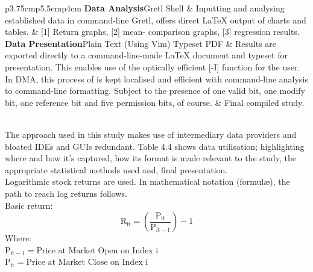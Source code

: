 \documentclass[11pt, english]{article}
\begin{document}
\begin{center}
\begin{longtable}{p{3.75cm}p{5.5cm}p{4cm}}
			\textbf{Data Analysis}\newline Gretl Shell & Inputting and analysing established data in command-line Gretl, offers direct {\LaTeX} output of charts and tables. & [1] Return graphs, [2] mean- comparison graphs, [3] regression results.\\
			\textbf{Data Presentation}\newline Plain Text (Using Vim)\newline {\LaTeX} Typeset PDF & Results are exported directly to a command-line-made {\LaTeX} document and typeset for presentation. This enables use of the optically efficient [-I] function for the user. In DMA, this process of is kept localised and efficient with command-line analysis to command-line formatting. Subject to the presence of one valid bit, one modify bit, one reference bit and five permission bits, of course. & Final compiled study.\\
			\hline
			\\
			\hline
			\caption{Data Processing Map}
		\end{longtable}
		\end{center}

		\newpage

		The approach used in this study makes use of intermediary data providers and bloated IDEs and GUIs redundant. Table 4.4 shows data utilisation; highlighting where and how it’s captured, how its format is made relevant to the study, the appropriate statistical methods used and, final presentation.\\

		Logarithmic stock returns are used. In mathematical notation (formul\ae), the path to reach log returns follows.\\

		Basic return:
		$$\mathrm{R_{it}=\left(\frac{P_{it}}{P_{it-1}}\right)-1}$$
		Where:\\
		$\mathrm{P_{it-1}=\textrm{Price at Market Open on Index i}}$\\ $\mathrm{P_{it}=\textrm{Price at Market Close on Index i}}$\\
\end{document}
